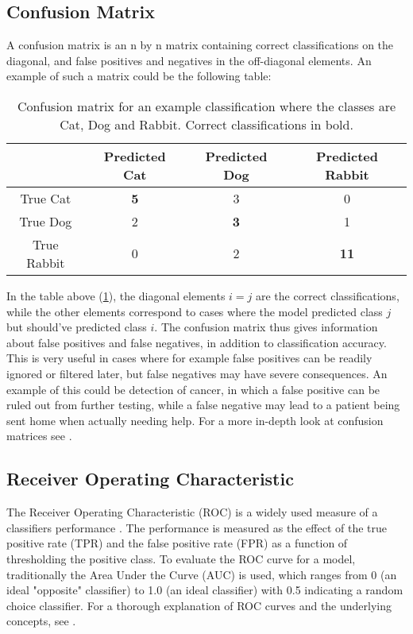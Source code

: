 \subsection{Confusion Matrix}
A confusion matrix is an n by n matrix containing correct classifications
on the diagonal, and false positives and negatives in the off-diagonal elements.
An example of such a matrix could be the following table:
\begin{table}[h]
    \centering
    \begin{tabular}{c|c|c|c}
     & Predicted Cat & Predicted Dog & Predicted Rabbit \\
    \hline
    True Cat & \textbf{5} & 3 & 0 \\
    \hline
    True Dog & 2 & \textbf{3} & 1 \\
    \hline
    True Rabbit & 0 & 2 & \textbf{11} \\
\end{tabular}
\caption{Confusion matrix for an example classification where the classes
         are Cat, Dog and Rabbit. Correct classifications in bold.}
\label{tab:confmat-example}
\end{table}
In the table above (\ref{tab:confmat-example}), the diagonal elements
$i = j$ are the correct classifications, while the other elements correspond
to cases where the model predicted class $j$ but should've predicted class $i$.
The confusion matrix thus gives information about false positives and false
negatives, in addition to classification accuracy. This is very useful
in cases where for example false positives can be readily ignored or filtered
later, but false negatives may have severe consequences. An example of this
could be detection of cancer, in which a false positive can be ruled out
from further testing, while a false negative may lead to a patient being sent
home when actually needing help. For a more in-depth look at confusion matrices
see \cite{Fawcett2006}.

\subsection{Receiver Operating Characteristic}
The Receiver Operating Characteristic (ROC) is a widely used measure of a
classifiers performance . The performance is measured as the effect
of the true positive rate (TPR) and the false positive rate (FPR) as a function
of thresholding the positive class. To evaluate the ROC curve for a model,
traditionally the Area Under the Curve (AUC) is used, which ranges from 0
(an ideal "opposite" classifier) to 1.0 (an ideal classifier) with 0.5
indicating a random choice classifier.
For a thorough explanation of ROC curves and the underlying concepts,
see \cite{Fawcett2006}.

